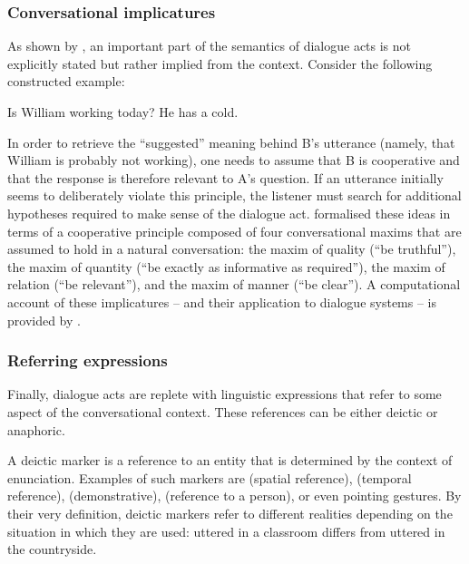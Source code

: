 \subsubsection*{Conversational implicatures}
As shown by \cite{Grice1989}, an important part of the semantics of dialogue acts is not explicitly stated but rather implied from the context.  Consider the following constructed example: 
\begin{center}
\begin{dialogue}
 Is William working today?
 He has a cold.
\end{dialogue}
\end{center}
In order to retrieve the ``suggested'' meaning behind B's utterance (namely, that William is probably not working), one needs to assume that B is cooperative and that the response is therefore relevant to A's question.  If an utterance initially seems to deliberately violate this principle, the listener must search for additional hypotheses required to make sense of the dialogue act. \cite{Grice1989} formalised these ideas in terms of a cooperative principle composed of four conversational maxims that are assumed to hold in a natural conversation: the maxim of quality (``be truthful''), the maxim of quantity (``be exactly as informative as required''), the maxim of relation (``be relevant''), and the maxim of manner (``be clear'').  A computational account of these implicatures -- and their application to dialogue systems -- is provided by \cite{benotti2010implicature}. 


\subsubsection*{Referring expressions}

Finally, dialogue acts are replete with linguistic expressions that refer to some aspect of the conversational context.  These references can be either deictic or anaphoric. 

A deictic marker is a reference to an entity that is determined by the context of enunciation.  Examples of such markers are  (spatial reference),  (temporal reference),  (demonstrative),  (reference to a person), or even pointing gestures. By their very definition, deictic markers refer to different realities depending on the situation in which they are used:  uttered in a classroom differs from  uttered in the countryside.  

